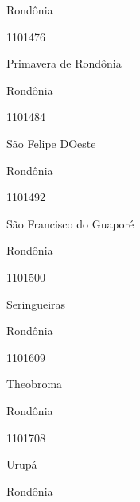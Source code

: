 \documentclass[
  letterpaper,
]{report}
\begin{document}
\n    

\n    

\n      

Rondônia

\n      

1101476

\n      

Primavera de Rondônia

\n    

\n    

\n      

Rondônia

\n      

1101484

\n      

São Felipe D\textquotesingle Oeste

\n    

\n    

\n      

Rondônia

\n      

1101492

\n      

São Francisco do Guaporé

\n    

\n    

\n      

Rondônia

\n      

1101500

\n      

Seringueiras

\n    

\n    

\n      

Rondônia

\n      

1101609

\n      

Theobroma

\n    

\n    

\n      

Rondônia

\n      

1101708

\n      

Urupá

\n    

\n    

\n      

Rondônia
\end{document}
